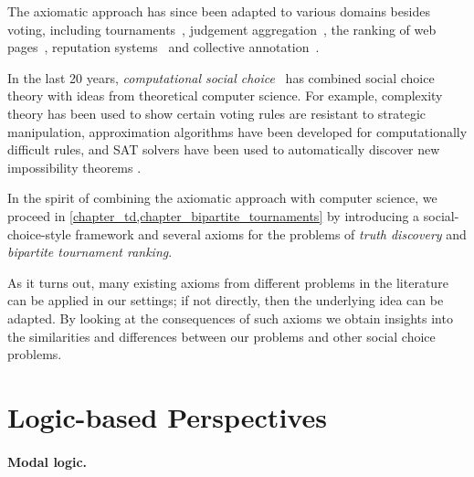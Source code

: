 The axiomatic approach has since been adapted to various domains besides
voting, including tournaments~\cite{brandt2016a}, judgement
aggregation~\cite{endriss2016ja}, the ranking of web
pages~\cite{altman2005ranking}, reputation systems~\cite{tennenholtz2004} and
collective annotation~\cite{kruger2014}.


In the last 20 years, \emph{computational social choice}~\cite{moulin_2016} has
combined social choice theory with ideas from theoretical computer science. For
example, complexity theory has been used to show certain voting rules are
resistant to strategic manipulation, approximation algorithms have been
developed for computationally difficult rules, and SAT solvers have been used
to automatically discover new impossibility theorems .

In the spirit of combining the axiomatic approach with computer science, we
proceed in \cref{chapter_td,chapter_bipartite_tournaments} by introducing a
social-choice-style framework and several axioms for the problems of
\emph{truth discovery} and \emph{bipartite tournament ranking}. 

As it turns out, many existing axioms from different problems in the literature
can be applied in our settings; if not directly, then the underlying idea can
be adapted. By looking at the consequences of such axioms we obtain insights
into the similarities and differences between our problems and other social
choice problems. 

\section{Logic-based Perspectives}
\label{intro_sec_logic_based_perspectives}

\paragraph{Modal logic.}

